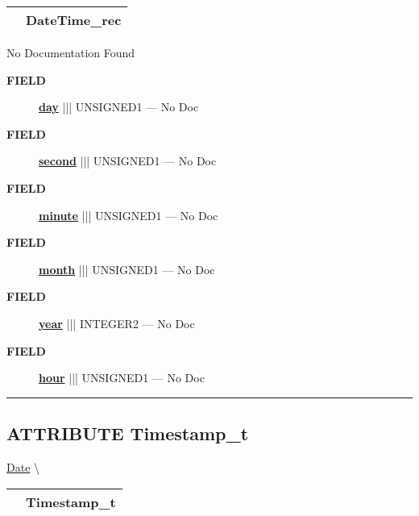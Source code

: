 {\renewcommand{\arraystretch}{1.5}
\begin{tabularx}{\textwidth}{|>{\raggedright\arraybackslash}l|X|}
\hline
\hspace{0pt}\mytexttt{\color{red} } & \textbf{DateTime\_rec} \\
\hline
\end{tabularx}
}

\par





No Documentation Found







\par
\begin{description}
\item [\colorbox{tagtype}{\color{white} \textbf{\textsf{FIELD}}}] \textbf{\underline{day}} ||| UNSIGNED1 --- No Doc
\item [\colorbox{tagtype}{\color{white} \textbf{\textsf{FIELD}}}] \textbf{\underline{second}} ||| UNSIGNED1 --- No Doc
\item [\colorbox{tagtype}{\color{white} \textbf{\textsf{FIELD}}}] \textbf{\underline{minute}} ||| UNSIGNED1 --- No Doc
\item [\colorbox{tagtype}{\color{white} \textbf{\textsf{FIELD}}}] \textbf{\underline{month}} ||| UNSIGNED1 --- No Doc
\item [\colorbox{tagtype}{\color{white} \textbf{\textsf{FIELD}}}] \textbf{\underline{year}} ||| INTEGER2 --- No Doc
\item [\colorbox{tagtype}{\color{white} \textbf{\textsf{FIELD}}}] \textbf{\underline{hour}} ||| UNSIGNED1 --- No Doc
\end{description}





\rule{\linewidth}{0.5pt}
\subsection*{\textsf{\colorbox{headtoc}{\color{white} ATTRIBUTE}
Timestamp\_t}}

\hypertarget{ecldoc:date.timestamp_t}{}
\hspace{0pt} \hyperlink{ecldoc:Date}{Date} \textbackslash 

{\renewcommand{\arraystretch}{1.5}
\begin{tabularx}{\textwidth}{|>{\raggedright\arraybackslash}l|X|}
\hline
\hspace{0pt}\mytexttt{\color{red} } & \textbf{Timestamp\_t} \\
\hline
\end{tabularx}
}

